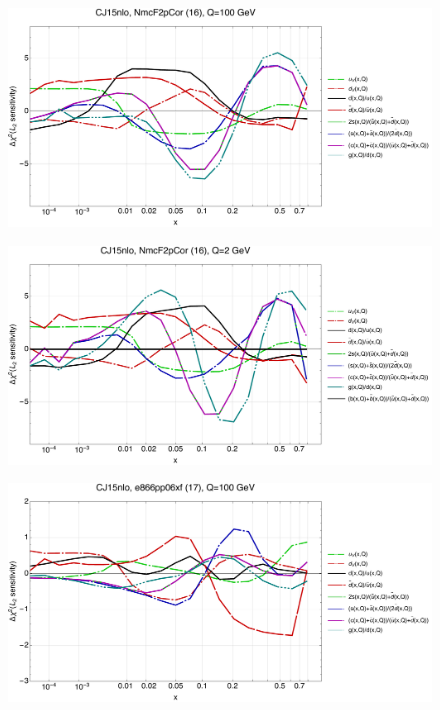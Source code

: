 \documentclass[10pt,aps,prd,floatfix,titlepage]{revtex4}
\begin{document}
\clearpage
\begin{figure}
\includegraphics[width=\textwidth,height=0.44\textheight,keepaspectratio]{2/16_CJ15nlo_q100_Sf_2.pdf}
\caption{}
\end{figure}
\begin{figure}
\includegraphics[width=\textwidth,height=0.44\textheight,keepaspectratio]{2/16_CJ15nlo_q2_Sf_2.pdf}
\caption{}
\end{figure}
\clearpage
\begin{figure}
\includegraphics[width=\textwidth,height=0.44\textheight,keepaspectratio]{2/17_CJ15nlo_q100_Sf_2.pdf}
\caption{}
\end{figure}
\end{document}
